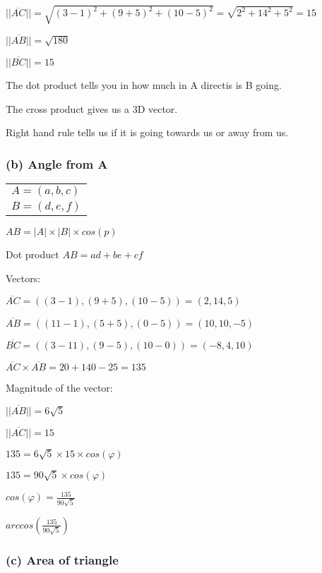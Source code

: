 \documentclass[12pt,a4paper]{article}
\begin{document}
\noindent $|| \overline{AC} || = \sqrt{(3-1)^2 + (9+5)^2 + (10-5)^2} = \sqrt{2^2 + 14^2 + 5^2} = 15$

\noindent $|| \overline{AB} || = \sqrt{180}$

\noindent $|| \overline{BC} || = 15$

\noindent The dot product tells you in how much in A directis is B going.

\noindent The cross product gives us a 3D vector.

\noindent Right hand rule tells us if it is going towards us or away from us.

\subsubsection*{(b) Angle from A}

\noindent \begin{tabular}{| l |}
\hline
$A = (a, b, c)$ \\
$B = (d, e, f)$ \\
\hline
\end{tabular}
\newline

\noindent $AB = |A| \times |B| \times cos(p)$

\noindent Dot product $ AB = ad + be + cf$
\noindent

\noindent Vectors:

\noindent $\overline{AC} = ((3-1), (9+5), (10-5)) = (2, 14, 5)$

\noindent $\overline{AB} = ((11-1), (5+5), (0-5)) = (10, 10, -5)$

\noindent $\overline{BC} = ((3-11), (9-5), (10-0)) = (-8, 4, 10)$

\noindent $\overline{AC} \times \overline{AB} = 20 + 140 - 25 = 135$

\noindent Magnitude of the vector: 

\noindent $||\overline{AB}|| = 6\sqrt{5}$

\noindent $||\overline{AC}|| = 15$

\noindent $135 = 6\sqrt{5} \times 15 \times cos(\varphi)$

\noindent $135 = 90 \sqrt{5} \times cos(\varphi)$
\newline

\noindent $cos(\varphi) = \frac{135}{90\sqrt{5}}$
\newline

\noindent $arccos(\frac{135}{90\sqrt{5}})$

\subsubsection*{(c) Area of triangle}
\end{document}
